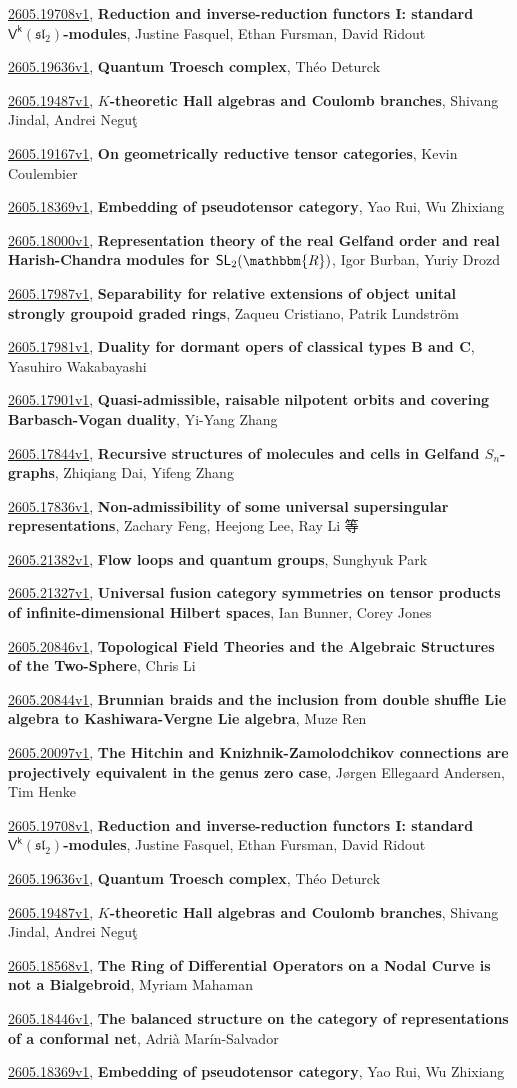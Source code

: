 \documentclass[9pt, a4paper]{article}
\theoremstyle{plain}
\theoremstyle{definition}
\theoremstyle{remark}
\newcommand{\arxiv}[3]{\href{https://arxiv.org/abs/#1}{#1}, \textbf{\textcolor{arxivblue}{#2}}, #3}
\begin{document}
\arxiv{2605.19708v1}{Reduction and inverse-reduction functors I: standard $\mathsf{V^k}(\mathfrak{sl}_2)$-modules}{Justine Fasquel, Ethan Fursman, David Ridout}

\arxiv{2605.19636v1}{Quantum Troesch complex}{Théo Deturck}

\arxiv{2605.19487v1}{$K$-theoretic Hall algebras and Coulomb branches}{Shivang Jindal, Andrei Neguţ}

\arxiv{2605.19167v1}{On geometrically reductive tensor categories}{Kevin Coulembier}

\arxiv{2605.18369v1}{Embedding of pseudotensor category}{Yao Rui, Wu Zhixiang}

\arxiv{2605.18000v1}{Representation theory of the real Gelfand order and real Harish-Chandra modules for $\mathsf{SL}_2(\mathbbm{R})$}{Igor Burban, Yuriy Drozd}

\arxiv{2605.17987v1}{Separability for relative extensions of object unital strongly groupoid graded rings}{Zaqueu Cristiano, Patrik Lundström}

\arxiv{2605.17981v1}{Duality for dormant opers of classical types B and C}{Yasuhiro Wakabayashi}

\arxiv{2605.17901v1}{Quasi-admissible, raisable nilpotent orbits and covering Barbasch-Vogan duality}{Yi-Yang Zhang}

\arxiv{2605.17844v1}{Recursive structures of molecules and cells in Gelfand $S_n$-graphs}{Zhiqiang Dai, Yifeng Zhang}

\arxiv{2605.17836v1}{Non-admissibility of some universal supersingular representations}{Zachary Feng, Heejong Lee, Ray Li 等}

\arxiv{2605.21382v1}{Flow loops and quantum groups}{Sunghyuk Park}

\arxiv{2605.21327v1}{Universal fusion category symmetries on tensor products of infinite-dimensional Hilbert spaces}{Ian Bunner, Corey Jones}

\arxiv{2605.20846v1}{Topological Field Theories and the Algebraic Structures of the Two-Sphere}{Chris Li}

\arxiv{2605.20844v1}{Brunnian braids and the inclusion from double shuffle Lie algebra to Kashiwara-Vergne Lie algebra}{Muze Ren}

\arxiv{2605.20097v1}{The Hitchin and Knizhnik-Zamolodchikov connections are projectively equivalent in the genus zero case}{Jørgen Ellegaard Andersen, Tim Henke}

\arxiv{2605.19708v1}{Reduction and inverse-reduction functors I: standard $\mathsf{V^k}(\mathfrak{sl}_2)$-modules}{Justine Fasquel, Ethan Fursman, David Ridout}

\arxiv{2605.19636v1}{Quantum Troesch complex}{Théo Deturck}

\arxiv{2605.19487v1}{$K$-theoretic Hall algebras and Coulomb branches}{Shivang Jindal, Andrei Neguţ}

\arxiv{2605.18568v1}{The Ring of Differential Operators on a Nodal Curve is not a Bialgebroid}{Myriam Mahaman}

\arxiv{2605.18446v1}{The balanced structure on the category of representations of a conformal net}{Adrià Marín-Salvador}

\arxiv{2605.18369v1}{Embedding of pseudotensor category}{Yao Rui, Wu Zhixiang}

\end{document}
